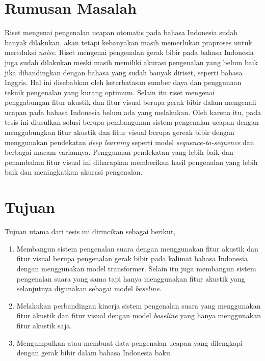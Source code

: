 \section{Rumusan Masalah}

Riset mengenai pengenalan ucapan otomatis pada bahasa Indonesia sudah banyak dilakukan, akan tetapi kebanyakan masih memerlukan praproses untuk mereduksi \textit{noise}. Riset mengenai pengenalan gerak bibir pada bahasa Indonesia juga sudah dilakukan meski masih memiliki akurasi pengenalan yang belum baik jika dibandingkan dengan bahasa yang sudah banyak diriset, seperti bahasa Inggris. Hal ini disebabkan oleh keterbatasan sumber daya dan penggunaan teknik pengenalan yang kurang optimum. Selain itu riset mengenai penggabungan fitur akustik dan fitur visual berupa gerak bibir dalam mengenali ucapan pada bahasa Indonesia belum ada yang melakukan. Oleh karena itu, pada tesis ini diusulkan solusi berupa pembangunan sistem pengenalan ucapan dengan menggabungkan fitur akustik dan fitur visual berupa gereak bibir dengan menggunakan pendekatan \textit{deep learning} seperti model \textit{sequence-to-sequence} dan berbagai macam variannya. Penggunaan pendekatan yang lebih baik dan penambahan fitur visual ini diharapkan memberikan hasil pengenalan yang lebih baik dan meningkatkan akurasi pengenalan.


\section{Tujuan}

Tujuan utama dari tesis ini dirincikan sebagai berikut,

\begin{enumerate}
    \item Membangun sistem pengenalan suara dengan menggunakan fitur akustik dan fitur visual berupa pengenalan gerak bibir pada kalimat bahasa Indonesia dengan menggunakan model transformer. Selain itu juga membangun sistem pengenalan suara yang sama tapi hanya menggunakan fitur akustik yang selanjutnya digunakan sebagai model \textit{baseline}.
    \item Melakukan perbandingan kinerja sistem pengenalan suara yang menggunakan fitur akustik dan fitur visual dengan model \textit{baseline} yang hanya menggunakan fitur akustik saja.
    \item Mengumpulkan atau membuat data pengenalan ucapan yang dilengkapi dengan gerak bibir dalam bahasa Indonesia baku.
\end{enumerate}



